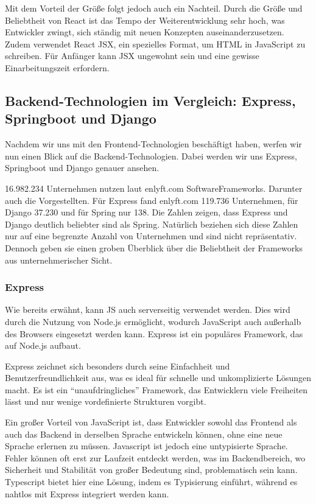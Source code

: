 \documentclass[biblatex]{lni}
\begin{document}
Mit dem Vorteil der Größe folgt jedoch auch ein Nachteil. \cite{BStack}
Durch die Größe und Beliebtheit von React ist das Tempo der Weiterentwicklung sehr hoch,
was Entwickler zwingt, sich ständig mit neuen Konzepten auseinanderzusetzen.
Zudem verwendet React \ac{JSX}, ein spezielles Format, um \ac{HTML} in JavaScript zu schreiben. \cite{JSX}
Für Anfänger kann \ac{JSX} ungewohnt sein und eine gewisse Einarbeitungszeit erfordern.

\subsection{Backend-Technologien im Vergleich: Express, Springboot und Django}

Nachdem wir uns mit den Frontend-Technologien beschäftigt haben, werfen wir nun einen Blick auf die Backend-Technologien.
Dabei werden wir uns Express, Springboot und Django genauer ansehen.

16.982.234 Unternehmen nutzen laut enlyft.com SoftwareFrameworks.
Darunter auch die Vorgestellten.
Für Express fand enlyft.com 119.736 Unternehmen, für Django 37.230 und für Spring nur 138.
Die Zahlen zeigen, dass Express und Django deutlich beliebter sind als Spring.
Natürlich beziehen sich diese Zahlen nur auf eine begrenzte Anzahl von Unternehmen und sind nicht repräsentativ.
Dennoch geben sie einen groben Überblick über die Beliebtheit der Frameworks aus unternehmerischer Sicht.

\subsubsection{Express}

Wie bereits erwähnt, kann \ac{JS} auch serverseitig verwendet werden.
Dies wird durch die Nutzung von Node.js ermöglicht, wodurch JavaScript auch außerhalb des Browsers eingesetzt werden kann.
Express ist ein populäres Framework, das auf Node.js aufbaut.

Express zeichnet sich besonders durch seine Einfachheit und Benutzerfreundlichkeit aus,
was es ideal für schnelle und unkomplizierte Lösungen macht.
Es ist ein “unaufdringliches” Framework, das Entwicklern viele Freiheiten lässt und nur wenige vordefinierte Strukturen vorgibt.

Ein großer Vorteil von JavaScript ist,
dass Entwickler sowohl das Frontend als auch das Backend in derselben Sprache entwickeln können,
ohne eine neue Sprache erlernen zu müssen.
Javascript ist jedoch eine untypisierte Sprache.
Fehler können oft erst zur Laufzeit entdeckt werden, was im Backendbereich,
wo Sicherheit und Stabilität von großer Bedeutung sind, problematisch sein kann.
Typescript bietet hier eine Lösung, indem es Typisierung einführt, während es nahtlos mit Express integriert werden kann.
\end{document}
